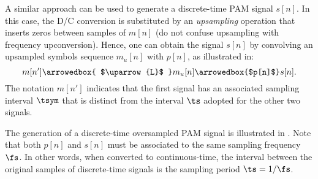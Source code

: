 A similar approach can be used to generate a discrete-time PAM signal $s[n]$. In this case, the D/C conversion is substituted by an \emph{upsampling} operation that inserts zeros between samples of $m[n]$ (do not confuse upsampling with frequency upconversion).
Hence, 
one can obtain the signal $s[n]$ by convolving an upsampled symbols sequence $m_u[n]$ with $p[n]$, as illustrated in:
\begin{equation}
m[n'] \arrowedbox{ $\uparrow{L}$ } m_u[n] \arrowedbox{$p[n]$} s[n].
\label{eq:linecodegenerationDiscreteTime}
\end{equation}
The notation $m[n']$ indicates that the first signal has an associated sampling interval $\tsym$ that is distinct from the interval $\ts$ adopted for the other two signals.

The generation of a discrete-time oversampled PAM signal is illustrated in .
Note that both $p[n]$ and $s[n]$ must be associated to the same sampling frequency $\fs$. In other words, when converted to continuous-time, the interval between the original samples of discrete-time signals is the sampling period $\ts=1/\fs$.



%

